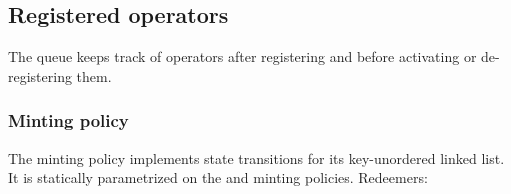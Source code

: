 \documentclass[../midgard.tex]{subfiles}
\begin{document}
\subsection{Registered operators}
\label{h:registered-operators}

The  queue keeps track of operators after registering and before activating or de-registering them.

\subsubsection{Minting policy}
\label{h:registered-operators-minting-policy}

The  minting policy implements state transitions for its key-unordered linked list.
It is statically parametrized on the  and  minting policies.
Redeemers:
\end{document}
